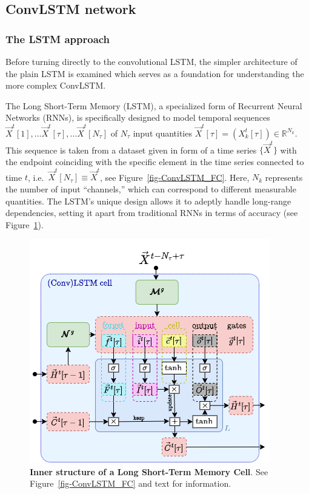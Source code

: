 \documentclass[
]{agujournal2019}
\begin{document}
\hypertarget{convlstm-network}{%
\subsection{ConvLSTM network}\label{convlstm-network}}

\hypertarget{sec-LSTM}{%
\subsubsection{The LSTM approach}\label{sec-LSTM}}

Before turning directly to the convolutional LSTM, the simpler
architecture of the plain LSTM is examined which serves as a foundation
for understanding the more complex ConvLSTM.

The Long Short-Term Memory (LSTM), a specialized form of Recurrent
Neural Networks (RNNs), is specifically designed to model temporal
sequences
\(\vec{X}^t[1], \ldots \vec{X}^t[\tau],\ldots \vec{X}^t[N_\tau]\) of
\(N_\tau\) input quantities
\(\vec{X}^t[\tau] = (X^t_k[\tau]) \in \mathbb{R}^{N_k}\). This sequence
is taken from a dataset given in form of a time series \(\{\vec{X}^t\}\)
with the endpoint coinciding with the specific element in the time
series connected to time \(t\),
i.e.~\(\vec{X}^t[N_\tau] \equiv \vec{X}^t\), see
Figure~\ref{fig-ConvLSTM_FC}. Here, \(N_k\) represents the number of
input ``channels,'' which can correspond to different measurable
quantities. The LSTM's unique design allows it to adeptly handle
long-range dependencies, setting it apart from traditional RNNs in terms
of accuracy (see Figure~\ref{fig-lstm}).

\begin{figure}

{\centering \includegraphics{./LSTM.png}

}

\caption{\label{fig-lstm}\textbf{Inner structure of a Long Short-Term
Memory Cell}. See Figure~\ref{fig-ConvLSTM_FC} and text for
information.}

\end{figure}
\end{document}
